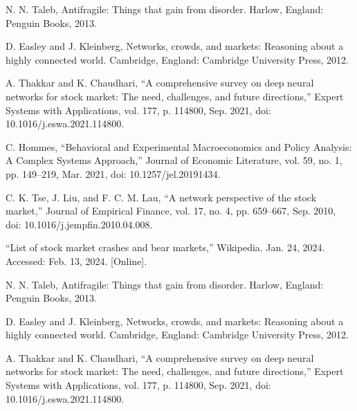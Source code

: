 \documentclass[letterpaper, 10 pt, proceedings]{ieeetran}  %
\begin{document}
	
	
%
	
	
	\begin{thebibliography}{99}	
		N. N. Taleb, Antifragile: Things that gain from disorder. Harlow, England: Penguin Books, 2013.
		
		D. Easley and J. Kleinberg, Networks, crowds, and markets: Reasoning about a highly connected world. Cambridge, England: Cambridge University Press, 2012.
		
		A. Thakkar and K. Chaudhari, “A comprehensive survey on deep neural networks for stock market: The need, challenges, and future directions,” Expert Systems with Applications, vol. 177, p. 114800, Sep. 2021, doi: 10.1016/j.eswa.2021.114800.
		
		C. Hommes, “Behavioral and Experimental Macroeconomics and Policy Analysis: A Complex Systems Approach,” Journal of Economic Literature, vol. 59, no. 1, pp. 149–219, Mar. 2021, doi: 10.1257/jel.20191434.
		
		C. K. Tse, J. Liu, and F. C. M. Lau, “A network perspective of the stock market,” Journal of Empirical Finance, vol. 17, no. 4, pp. 659–667, Sep. 2010, doi: 10.1016/j.jempfin.2010.04.008.
		
		“List of stock market crashes and bear markets,” Wikipedia. Jan. 24, 2024. Accessed: Feb. 13, 2024. [Online].
		
		N. N. Taleb, Antifragile: Things that gain from disorder. Harlow, England: Penguin Books, 2013.
		
		D. Easley and J. Kleinberg, Networks, crowds, and markets: Reasoning about a highly connected world. Cambridge, England: Cambridge University Press, 2012.
		
		A. Thakkar and K. Chaudhari, “A comprehensive survey on deep neural networks for stock market: The need, challenges, and future directions,” Expert Systems with Applications, vol. 177, p. 114800, Sep. 2021, doi: 10.1016/j.eswa.2021.114800.
		

\end{thebibliography}
\end{document}
